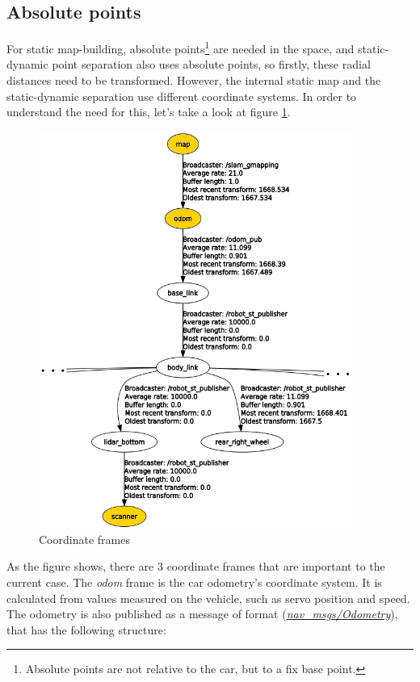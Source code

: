 \subsection{Absolute points}
\label{chap:absolute_points}
For static map-building, absolute points\footnote{Absolute points are not relative to the car, but to a fix base point.} are needed in the space, and static-dynamic point separation also uses absolute points, so firstly, these radial distances need to be transformed. However, the internal static map and the static-dynamic separation use different coordinate systems. In order to understand the need for this, let's take a look at figure \ref{rqt_input}.

\begin{figure}[!ht]
    \centering
    \includegraphics[height=130mm]{figures/raw/rqt_input.png}
    \caption{Coordinate frames}
    \label{rqt_input}
\end{figure}

As the figure shows, there are 3 coordinate frames that are important to the current case. The \textit{odom} frame is the car odometry's coordinate system. It is calculated from values measured on the vehicle, such as servo position and speed. The odometry is also published as a message of format (\href{http://docs.ros.org/melodic/api/nav_msgs/html/msg/Odometry.html}{\textit{nav\_msgs/Odometry}}), that has the following structure:

